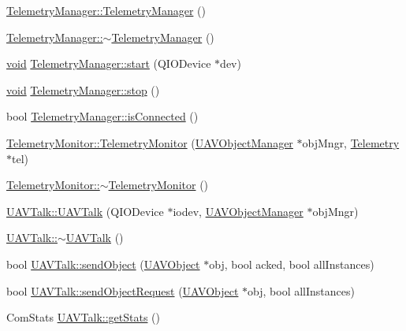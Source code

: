 \begin{DoxyCompactItemize}
\item 
\hyperlink{group___u_a_v_talk_plugin_gaab121ca26ff1b0985b013d715132a088}{\-Telemetry\-Manager\-::\-Telemetry\-Manager} ()
\item 
\hyperlink{group___u_a_v_talk_plugin_ga28e48a3688e195cc9c3263ccdeb084c4}{\-Telemetry\-Manager\-::$\sim$\-Telemetry\-Manager} ()
\item 
\hyperlink{group___u_a_v_objects_plugin_ga444cf2ff3f0ecbe028adce838d373f5c}{void} \hyperlink{group___u_a_v_talk_plugin_ga48c17e83f41b742abc5c234963093171}{\-Telemetry\-Manager\-::start} (\-Q\-I\-O\-Device $\ast$dev)
\item 
\hyperlink{group___u_a_v_objects_plugin_ga444cf2ff3f0ecbe028adce838d373f5c}{void} \hyperlink{group___u_a_v_talk_plugin_ga59bfea54673b2ab51e9ac1bf3a186718}{\-Telemetry\-Manager\-::stop} ()
\item 
bool \hyperlink{group___u_a_v_talk_plugin_ga73bf9fbd67f3eb0451363525de9cc7de}{\-Telemetry\-Manager\-::is\-Connected} ()
\item 
\hyperlink{group___u_a_v_talk_plugin_gad2af9cb530ef07a84cc9992d6458111f}{\-Telemetry\-Monitor\-::\-Telemetry\-Monitor} (\hyperlink{class_u_a_v_object_manager}{\-U\-A\-V\-Object\-Manager} $\ast$obj\-Mngr, \hyperlink{class_telemetry}{\-Telemetry} $\ast$tel)
\item 
\hyperlink{group___u_a_v_talk_plugin_gabe2f26f1992e78356a82b135aeac951e}{\-Telemetry\-Monitor\-::$\sim$\-Telemetry\-Monitor} ()
\item 
\hyperlink{group___u_a_v_talk_plugin_ga53c36c64288a62b44a285dfb40cee946}{\-U\-A\-V\-Talk\-::\-U\-A\-V\-Talk} (\-Q\-I\-O\-Device $\ast$iodev, \hyperlink{class_u_a_v_object_manager}{\-U\-A\-V\-Object\-Manager} $\ast$obj\-Mngr)
\item 
\hyperlink{group___u_a_v_talk_plugin_ga1c6de05403ed728008c21592d142375e}{\-U\-A\-V\-Talk\-::$\sim$\-U\-A\-V\-Talk} ()
\item 
bool \hyperlink{group___u_a_v_talk_plugin_gafb99b5df957808785013366dfd5bc636}{\-U\-A\-V\-Talk\-::send\-Object} (\hyperlink{class_u_a_v_object}{\-U\-A\-V\-Object} $\ast$obj, bool acked, bool all\-Instances)
\item 
bool \hyperlink{group___u_a_v_talk_plugin_ga884c8680ea2c95bef75fca2c4c95867d}{\-U\-A\-V\-Talk\-::send\-Object\-Request} (\hyperlink{class_u_a_v_object}{\-U\-A\-V\-Object} $\ast$obj, bool all\-Instances)
\item 
\-Com\-Stats \hyperlink{group___u_a_v_talk_plugin_gac9f7d49b556190b1b7d4b845b8b23a34}{\-U\-A\-V\-Talk\-::get\-Stats} ()
\item 

\end{DoxyCompactItemize}
